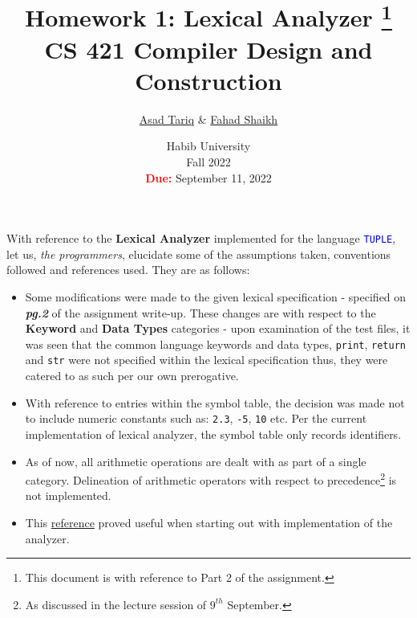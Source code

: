 \documentclass[a4paper, 10pt, oneside]{article}
\title{Homework 1: Lexical Analyzer \footnote{This document is with reference to Part 2 of the assignment.}\\CS 421 Compiler Design and Construction}
\author{\href{mailto:at05439@st.habib.edu.pk}{Asad Tariq} \& \href{mailto:fs05452@st.habib.edu.pk}{Fahad Shaikh}}
\date{Habib University\\Fall 2022\\\textbf{\textcolor{red}{Due:}} September 11, 2022}
\begin{document}
\maketitle
\noindent
With reference to the \textbf{Lexical Analyzer} implemented for the language \texttt{\textcolor{blue}{TUPLE}}, let us, \textit{the programmers},
elucidate some of the assumptions taken, conventions followed and references used. They are as follows:
\begin{itemize}
    \item Some modifications were made to the given lexical specification - specified on \emph{\textbf{pg.2}} of the assignment write-up. These changes
    are with respect to the \textbf{Keyword} and \textbf{Data Types} categories - upon examination of the test files, it was seen that the common language
    keywords and data types, \texttt{print}, \texttt{return} and \texttt{str} were not specified within the lexical specification thus, they were catered to
    as such per our own prerogative.
    \item With reference to entries within the symbol table, the decision was made not to include numeric constants such as: \texttt{2.3}, \texttt{-5}, \texttt{10} etc. Per the
    current implementation of lexical analyzer, the symbol table only records identifiers.
    \item As of now, all arithmetic operations are dealt with as part of a single category. Delineation of arithmetic operators with respect to precedence\footnote{As discussed in the lecture session of $9^{th}$ September.} is not implemented.
    \item This \href{https://austinhenley.com/blog/teenytinycompiler1.html}{reference} proved useful when starting out with implementation of the analyzer.
\end{itemize}
\end{document}
